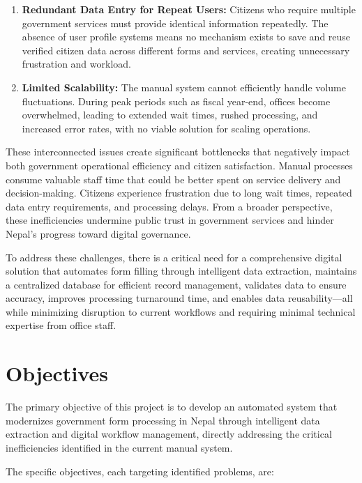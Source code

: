\documentclass[12pt]{report}
\begin{document}
\begin{enumerate}[label=\textbullet, leftmargin=*, nosep, itemsep=3pt, topsep=2pt]
 \item \textbf{Redundant Data Entry for Repeat Users:} Citizens who require 
   multiple government services must provide identical information repeatedly. 
   The absence of user profile systems means no mechanism exists to save and 
   reuse verified citizen data across different forms and services, creating 
   unnecessary frustration and workload.

 \item \textbf{Limited Scalability:} The manual system cannot efficiently handle 
   volume fluctuations. During peak periods such as fiscal year-end, offices become 
   overwhelmed, leading to extended wait times, rushed processing, and increased 
   error rates, with no viable solution for scaling operations.
\end{enumerate}

These interconnected issues create significant bottlenecks that negatively impact 
both government operational efficiency and citizen satisfaction. Manual processes 
consume valuable staff time that could be better spent on service delivery and 
decision-making. Citizens experience frustration due to long wait times, repeated 
data entry requirements, and processing delays. From a broader perspective, these 
inefficiencies undermine public trust in government services and hinder Nepal's 
progress toward digital governance. 

To address these challenges, there is a critical need for a comprehensive digital 
solution that automates form filling through intelligent data extraction, maintains 
a centralized database for efficient record management, validates data to ensure 
accuracy, improves processing turnaround time, and enables data reusability—all 
while minimizing disruption to current workflows and requiring minimal technical 
expertise from office staff.

\section{Objectives}
The primary objective of this project is to develop an automated system that 
modernizes government form processing in Nepal through intelligent data extraction 
and digital workflow management, directly addressing the critical inefficiencies 
identified in the current manual system.

The specific objectives, each targeting identified problems, are:
\end{document}
